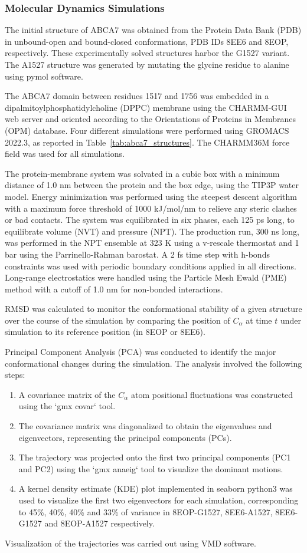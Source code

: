 \subsubsection{Molecular Dynamics Simulations }
The initial structure of ABCA7 was obtained from the Protein Data Bank (PDB) in unbound-open and bound-closed conformations, PDB IDs 8EE6 and 8EOP, respectively. These experimentally solved structures harbor the G1527 variant. The A1527 structure was generated by mutating the glycine residue to alanine using pymol software. 
 
The ABCA7 domain between residues 1517 and 1756 was embedded in a dipalmitoylphosphatidylcholine (DPPC) membrane using the CHARMM-GUI web server and oriented according to the Orientations of Proteins in Membranes (OPM) database. Four different simulations were performed using GROMACS 2022.3, as reported in Table~\ref{tab:abca7_structures}. The CHARMM36M force field was used for all simulations.  
 
The protein-membrane system was solvated in a cubic box with a minimum distance of 1.0 nm between the protein and the box edge, using the TIP3P water model. Energy minimization was performed using the steepest descent algorithm with a maximum force threshold of 1000 kJ/mol/nm to relieve any steric clashes or bad contacts. The system was equilibrated in six phases, each 125 ps long, to equilibrate volume (NVT) and pressure (NPT). The production run, 300 ns long, was performed in the NPT ensemble at 323 K using a v-rescale thermostat and 1 bar using the Parrinello-Rahman barostat. A 2 fs time step with h-bonds constraints was used with periodic boundary conditions applied in all directions. Long-range electrostatics were handled using the Particle Mesh Ewald (PME) method with a cutoff of 1.0 nm for non-bonded interactions. 
 
RMSD was calculated to monitor the conformational stability of a given structure over the course of the simulation by comparing the position of $C_\alpha$ at time $t$ under simulation to its reference position (in 8EOP or 8EE6). 
 
Principal Component Analysis (PCA) was conducted to identify the major conformational changes during the simulation. The analysis involved the following steps:
\begin{enumerate}
    \item A covariance matrix of the $C_\alpha$ atom positional fluctuations was constructed using the `gmx covar` tool. 
    \item The covariance matrix was diagonalized to obtain the eigenvalues and eigenvectors, representing the principal components (PCs). 
    \item The trajectory was projected onto the first two principal components (PC1 and PC2) using the `gmx anaeig` tool to visualize the dominant motions.  
    \item A kernel density estimate (KDE) plot implemented in seaborn python3 was used to visualize the first two eigenvectors for each simulation, corresponding to 45\%, 40\%, 40\% and 33\% of variance in 8EOP-G1527, 8EE6-A1527, 8EE6-G1527 and 8EOP-A1527 respectively. 
\end{enumerate}

Visualization of the trajectories was carried out using VMD software. 
